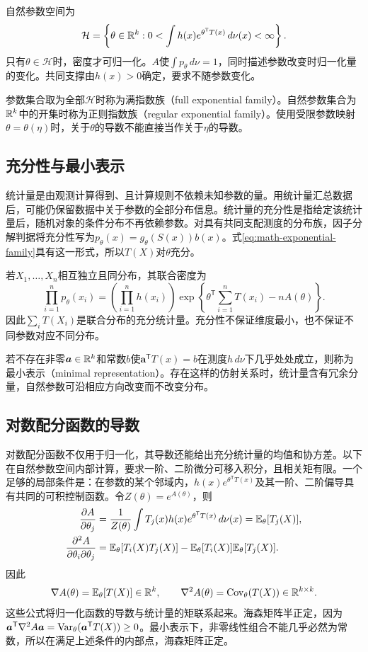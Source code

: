 自然参数空间为
\begin{equation}
 \mathcal H=\left\{\theta\in\mathbb{R}^k:
 0<\int h(x)e^{\theta^{\mathsf T}T(x)}\,d\nu(x)<\infty\right\}.
\end{equation}
只有$\theta\in\mathcal H$时，密度才可归一化。$A$使$\int p_\theta\,d\nu=1$，同时描述参数改变时归一化量的变化。共同支撑由$h(x)>0$确定，要求不随参数变化。

参数集合取为全部$\mathcal H$时称为满指数族（full exponential family）。自然参数集合为$\mathbb{R}^k$中的开集时称为正则指数族（regular exponential family）。使用受限参数映射$\theta=\theta(\eta)$时，关于$\theta$的导数不能直接当作关于$\eta$的导数。

\subsection{充分性与最小表示}
统计量是由观测计算得到、且计算规则不依赖未知参数的量。用统计量汇总数据后，可能仍保留数据中关于参数的全部分布信息。统计量的充分性是指给定该统计量后，随机对象的条件分布不再依赖参数。对具有共同支配测度的分布族，因子分解判据将充分性写为$p_\theta(x)=g_\theta(S(x))b(x)$。式\eqref{eq:math-exponential-family}具有这一形式，所以$T(X)$对$\theta$充分。

若$X_1,\ldots,X_n$相互独立且同分布，其联合密度为
\begin{equation}
 \prod_{i=1}^np_\theta(x_i)=\left(\prod_{i=1}^nh(x_i)\right)
 \exp\left\{\theta^{\mathsf T}\sum_{i=1}^nT(x_i)-nA(\theta)\right\}.
\end{equation}
因此$\sum_iT(X_i)$是联合分布的充分统计量。充分性不保证维度最小，也不保证不同参数对应不同分布。

若不存在非零$\bm a\in\mathbb{R}^k$和常数$b$使$\bm a^{\mathsf T}T(x)=b$在测度$h\,d\nu$下几乎处处成立，则称为最小表示（minimal representation）。存在这样的仿射关系时，统计量含有冗余分量，自然参数可沿相应方向改变而不改变分布。

\subsection{对数配分函数的导数}
对数配分函数不仅用于归一化，其导数还能给出充分统计量的均值和协方差。以下在自然参数空间内部计算，要求一阶、二阶微分可移入积分，且相关矩有限。一个足够的局部条件是：在参数的某个邻域内，$h(x)e^{\theta^{\mathsf T}T(x)}$及其一阶、二阶偏导具有共同的可积控制函数。令$Z(\theta)=e^{A(\theta)}$，则
\begin{align}
 \frac{\partial A}{\partial\theta_j}
 &=\frac1{Z(\theta)}\int T_j(x)h(x)e^{\theta^{\mathsf T}T(x)}\,d\nu(x)
 =\mathbb{E}_\theta[T_j(X)],\\
 \frac{\partial^2A}{\partial\theta_i\partial\theta_j}
 &=\mathbb{E}_\theta[T_i(X)T_j(X)]-\mathbb{E}_\theta[T_i(X)]\mathbb{E}_\theta[T_j(X)].
\end{align}
因此
\begin{equation}
 \nabla A(\theta)=\mathbb{E}_\theta[T(X)]\in\mathbb{R}^k,\qquad
 \nabla^2A(\theta)=\operatorname{Cov}_\theta(T(X))\in\mathbb{R}^{k\times k}.
 \label{eq:math-log-partition-derivatives}
\end{equation}
这些公式将归一化函数的导数与统计量的矩联系起来。海森矩阵半正定，因为$\bm a^{\mathsf T}\nabla^2A\bm a=\operatorname{Var}_\theta(\bm a^{\mathsf T}T(X))\geq0$。最小表示下，非零线性组合不能几乎必然为常数，所以在满足上述条件的内部点，海森矩阵正定。

